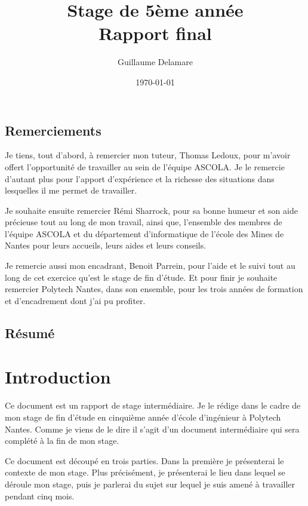\documentclass[a4paper, 11pt]{report}
\title{Stage de 5ème année\\ \large Rapport final}
\author{Guillaume Delamare}
\date{\today}
\begin{document}
\renewcommand{\labelitemi}{$\bullet$}
\renewcommand{\labelitemii}{$\diamond$}
\renewcommand{\labelitemiii}{$\ast$}
\renewcommand{\labelitemiv}{$\cdot$}

\maketitle

\section*{Remerciements}
Je tiens, tout d'abord, à remercier mon tuteur, Thomas Ledoux, pour m'avoir offert l'opportunité de travailler au sein de l'équipe ASCOLA. Je le remercie d'autant plus pour l'apport d'expérience et la richesse des situations dans lesquelles il me permet de travailler.

Je souhaite ensuite remercier Rémi Sharrock, pour sa bonne humeur et son aide précieuse tout au long de mon travail, ainsi que, l'ensemble des membres de l'équipe ASCOLA et du département d'informatique de l'école des Mines de Nantes pour leurs accueils, leurs aides et leurs conseils.

Je remercie aussi mon encadrant, Benoit Parrein, pour l'aide et le suivi tout au long de cet exercice qu'est le stage de fin d'étude. Et pour finir je souhaite remercier Polytech Nantes, dans son ensemble, pour les trois années de formation et d'encadrement dont j'ai pu profiter.

\newpage

\section*{Résumé}

\newpage

\tableofcontents

\chapter{Introduction}
Ce document est un rapport de stage intermédiaire. Je le rédige dans le cadre de mon stage de fin d'étude en cinquième année d'école d'ingénieur à Polytech Nantes. Comme je viens de le dire il s'agit d'un document intermédiaire qui sera complété à la fin de mon stage. 

Ce document est découpé en trois parties. Dans la première je présenterai le contexte de mon stage. Plus précisément, je présenterai le lieu dans lequel se déroule mon stage, puis je parlerai du sujet sur lequel je suis amené à travailler pendant cinq mois.
\end{document}

